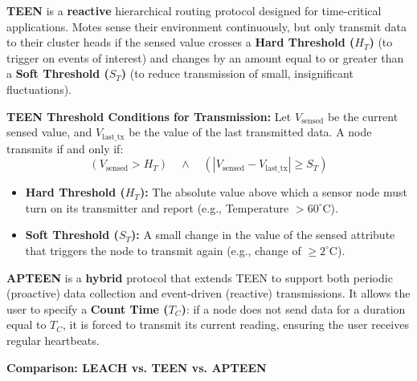 \documentclass[12pt,a4paper]{article}
\begin{document}
\begin{tcolorbox}[defbox, title={\textbf{TEEN (Threshold sensitive Energy Efficient sensor Network) --- Definition}}]
\textbf{TEEN} is a \textbf{reactive} hierarchical routing protocol designed for time-critical applications. Motes sense their environment continuously, but only transmit data to their cluster heads if the sensed value crosses a \textbf{Hard Threshold ($H_T$)} (to trigger on events of interest) and changes by an amount equal to or greater than a \textbf{Soft Threshold ($S_T$)} (to reduce transmission of small, insignificant fluctuations).
\end{tcolorbox}

\textbf{TEEN Threshold Conditions for Transmission:}
Let $V_{\text{sensed}}$ be the current sensed value, and $V_{\text{last\_tx}}$ be the value of the last transmitted data. A node transmits if and only if:
\[
(V_{\text{sensed}} > H_T) \quad \land \quad (|V_{\text{sensed}} - V_{\text{last\_tx}}| \geq S_T)
\]
\begin{itemize}[leftmargin=*, itemsep=3pt]
  \item \textbf{Hard Threshold ($H_T$):} The absolute value above which a sensor node must turn on its transmitter and report (e.g., Temperature $> 60^\circ$C).
  \item \textbf{Soft Threshold ($S_T$):} A small change in the value of the sensed attribute that triggers the node to transmit again (e.g., change of $\ge 2^\circ$C).
\end{itemize}

\begin{tcolorbox}[defbox, title={\textbf{APTEEN (Adaptive Periodic Threshold sensitive Energy Efficient) --- Definition}}]
\textbf{APTEEN} is a \textbf{hybrid} protocol that extends TEEN to support both periodic (proactive) data collection and event-driven (reactive) transmissions. It allows the user to specify a \textbf{Count Time ($T_C$)}: if a node does not send data for a duration equal to $T_C$, it is forced to transmit its current reading, ensuring the user receives regular heartbeats.
\end{tcolorbox}

\textbf{Comparison: LEACH vs. TEEN vs. APTEEN}
\end{document}
